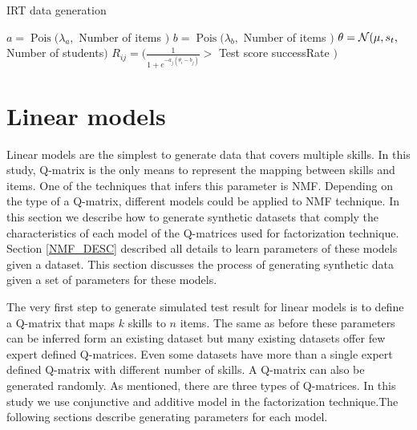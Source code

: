\begin{algorithm}
\caption{IRT data generation}
\label{CHalgorithm}
\begin{algorithmic}[1]
\State $a = \operatorname{Pois} ({\lambda_a},$ Number of items $)$
\State $b = \operatorname{Pois} ({\lambda_b},$ Number of items $)$
\State $\theta = \mathcal{N}(\mu, s_t ,$ Number of students$)$
\State $R_{ij} = (\frac{1}{1+e^{-a_j(\theta_i-b_j)}} >$ Test score successRate $)$
\EndFor
\EndFor
\end{algorithmic}
\label{Alg:IRTGen}
\end{algorithm}






\section{Linear models}
\label{LinearModelSynthetic}
Linear models are the simplest to generate data that covers multiple skills. In this study, Q-matrix is the only means to represent the mapping between skills and items. One of the techniques that infers this parameter is NMF. Depending on the type of a Q-matrix, different models could be applied to NMF technique. In this section we describe how to generate synthetic datasets that comply the characteristics of each model of the Q-matrices used for factorization technique. Section \ref{NMF_DESC} described all details to learn parameters of these models given a dataset. This section discusses the process of generating synthetic data given a set of parameters for these models.

The very first step to generate simulated test result for linear models is to define a Q-matrix that maps $k$ skills to $n$ items. The same as before these parameters can be inferred form an existing dataset but many existing datasets offer few expert defined Q-matrices. Even some datasets have more than a single expert defined Q-matrix with different number of skills. A Q-matrix can also be generated randomly. As mentioned, there are three types of Q-matrices. In this study we use conjunctive and additive model in the factorization technique.The following sections describe generating parameters for each model.

